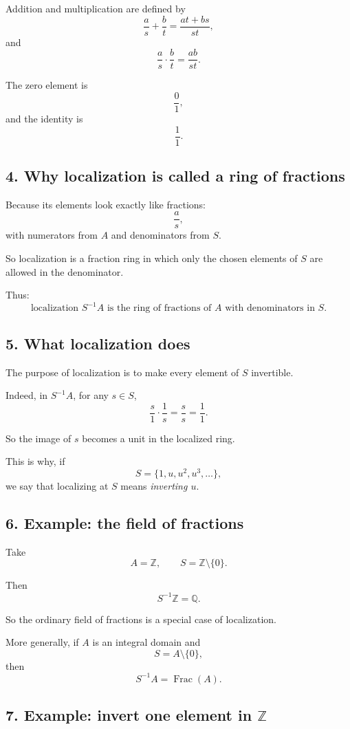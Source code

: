\documentclass[12pt,a4paper]{article}
\theoremstyle{notespace}
\DeclareMathOperator{\Frac}{Frac}
\begin{document}
Addition and multiplication are defined by
\[
\frac{a}{s}+\frac{b}{t}=\frac{at+bs}{st},
\]
and
\[
\frac{a}{s}\cdot \frac{b}{t}=\frac{ab}{st}.
\]

The zero element is
\[
\frac{0}{1},
\]
and the identity is
\[
\frac{1}{1}.
\]

\subsection{4. Why localization is called a ring of fractions}

Because its elements look exactly like fractions:
\[
\frac{a}{s},
\]
with numerators from \(A\) and denominators from \(S\).

So localization is a fraction ring in which only the chosen elements of \(S\) are allowed in the denominator.

Thus:
\[
\boxed{\text{localization } S^{-1}A \text{ is the ring of fractions of } A \text{ with denominators in } S.}
\]

\subsection{5. What localization does}

The purpose of localization is to make every element of \(S\) invertible.

Indeed, in \(S^{-1}A\), for any \(s\in S\),
\[
\frac{s}{1}\cdot \frac{1}{s}=\frac{s}{s}=\frac{1}{1}.
\]

So the image of \(s\) becomes a unit in the localized ring.

This is why, if
\[
S=\{1,u,u^2,u^3,\dots\},
\]
we say that localizing at \(S\) means \emph{inverting \(u\)}.

\subsection{6. Example: the field of fractions}

Take
\[
A=\mathbb Z,
\qquad
S=\mathbb Z\setminus\{0\}.
\]

Then
\[
S^{-1}\mathbb Z=\mathbb Q.
\]

So the ordinary field of fractions is a special case of localization.

More generally, if \(A\) is an integral domain and
\[
S=A\setminus\{0\},
\]
then
\[
S^{-1}A=\Frac(A).
\]

\subsection{7. Example: invert one element in \(\mathbb Z\)}
\end{document}
